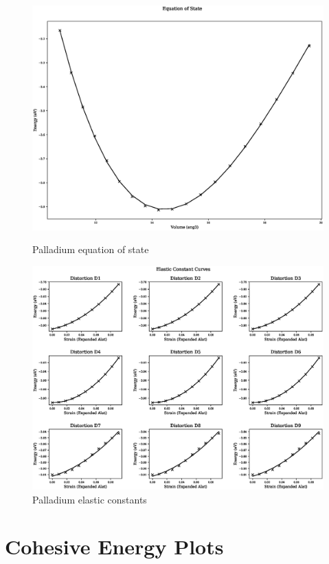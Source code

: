 \begin{figure}[ht] 
  \begin{minipage}[b]{0.4\linewidth}
    \centering
    \includegraphics[width=.9\linewidth]{chapters/results_potential_fitting/pot_fepd_fcc_2/pd_eos_0.eps} 
    \caption{Palladium equation of state}  
  \end{minipage}%
  \begin{minipage}[b]{0.4\linewidth}
    \centering
    \includegraphics[width=.9\linewidth]{chapters/results_potential_fitting/pot_fepd_fcc_2/pd_ec_0.eps} 
    \caption{Palladium elastic constants}  
  \end{minipage}%
\end{figure}


\FloatBarrier
\section{Cohesive Energy Plots}
\label{section:fepdv2coh}


